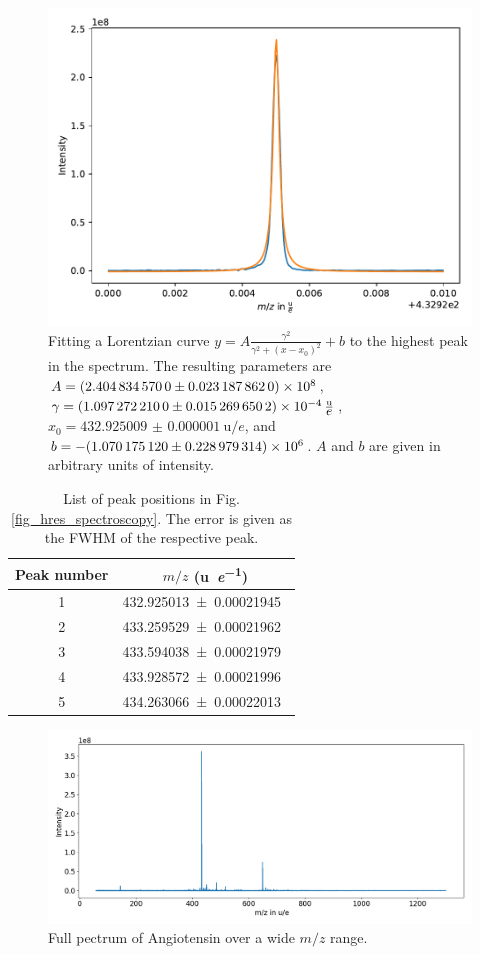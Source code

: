 \documentclass[a4paper,10pt]{article}
\begin{document}
\begin{figure}[htp!]
	\centering
	\includegraphics[width = 0.6 \textwidth]{fit_hires.pdf}
	\caption{Fitting a Lorentzian curve $y = A \frac{\gamma^2}{\gamma^2 + (x - x_0)^2} + b$ to the highest peak in the spectrum. The resulting parameters are $A = \num{2.40483457 \pm 0.0231878620 e8}$, $\gamma = \SI{1.09727221 \pm 0.0152696502 e-04}{\atomicmassunit \per \elementarycharge}$, $x_0 = \SI{432.925009(1)}{\atomicmassunit \per \elementarycharge}$, and $b = -\SI{1.07017512 \pm 0.228979314 e06}{}$. $A$ and $b$ are given in arbitrary units of intensity. }
	\label{fig_fit_hires}
\end{figure}

\begin{table}[htp!]
	\centering
	\caption{List of peak positions in Fig. \ref{fig_hres_spectroscopy}. The error is given as the FWHM of the respective peak.}
	\begin{tabular}{c | c }
		Peak number & $m/z$ (\si{\atomicmassunit \per \elementarycharge})\\ \hline
		1 & \SI{432.925013 \pm 0.00021945}{ }\\
		2 & \SI{433.259529 \pm 0.00021962}{ }\\
		3 & \SI{433.594038 \pm 0.00021979}{ }\\
		4 & \SI{433.928572 \pm 0.00021996}{ }\\
		5 & \SI{434.263066 \pm 0.00022013}{ }\\
	\end{tabular}
	\label{tab_peaks_spectrum}
\end{table}

\begin{figure}
  \centering
  \includegraphics[width = \textwidth]{humblespectrum.png}
  \caption{Full pectrum of Angiotensin over a wide $m/z$ range. }\label{fullspectrum}
\end{figure}
\end{document}
